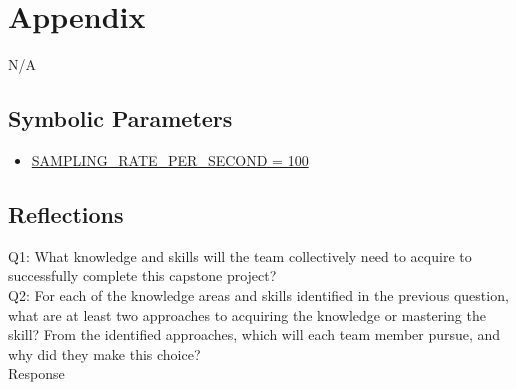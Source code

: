 \documentclass[12pt, titlepage]{article}
\begin{document}




\newpage

\section{Appendix}

N/A

\subsection{Symbolic Parameters}

\begin{itemize}
    \color{red}
    \item \hyperref[sec:sampling]{SAMPLING\_RATE\_PER\_SECOND = 100}
\end{itemize}

\subsection{Reflections}

\noindent Q1: What knowledge and skills will the team collectively need to acquire to successfully complete this capstone project? \\
\noindent Q2: For each of the knowledge areas and skills identified in the previous question, what are at least two approaches to acquiring the knowledge or mastering the skill? 
From the identified approaches, which will each team member pursue, and why did they make this choice?\\

\noindent Response
\end{document}
